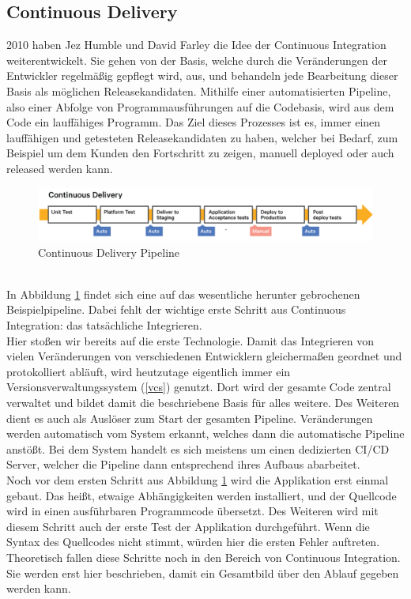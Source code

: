 \subsection{Continuous Delivery}
2010 haben Jez Humble und David Farley\autocite{Farley.2010} die Idee der Continuous Integration weiterentwickelt. Sie gehen von der Basis, welche durch die Veränderungen der Entwickler regelmäßig gepflegt wird, aus, und behandeln jede Bearbeitung dieser Basis als möglichen Releasekandidaten.\autocite[Vgl.][S.5]{Stahl.2018} Mithilfe einer automatisierten Pipeline, also einer Abfolge von Programmausführungen auf die Codebasis, wird aus dem Code ein lauffähiges Programm. Das Ziel dieses Prozesses ist es, immer einen lauffähigen und getesteten Releasekandidaten zu haben, welcher bei Bedarf, zum Beispiel um dem Kunden den Fortschritt zu zeigen, manuell deployed oder auch released werden kann.\autocite[Vgl.][S.16]{Stahl.2018}
\begin{figure}[h!]
	\centering
	\includegraphics[scale = 0.3]{img/CDE.png}
	\caption{Continuous Delivery Pipeline}
	\label{img:cde}
\end{figure}\\
In Abbildung \ref{img:cde} findet sich eine auf das wesentliche herunter gebrochenen Beispielpipeline. Dabei fehlt der wichtige erste Schritt aus Continuous Integration: das tatsächliche Integrieren.\\ Hier stoßen wir bereits auf die erste Technologie. Damit das Integrieren von vielen Veränderungen von verschiedenen Entwicklern gleichermaßen geordnet und protokolliert abläuft, wird heutzutage eigentlich immer ein Versionsverwaltungssystem (\ref{vcs}) genutzt.\autocite[Vgl.][S.2]{Arachchi.2018} Dort wird der gesamte Code zentral verwaltet und bildet damit die beschriebene Basis für alles weitere. Des Weiteren dient es auch als Auslöser zum Start der gesamten Pipeline. Veränderungen werden automatisch vom System erkannt, welches dann die automatische Pipeline anstößt. Bei dem System handelt es sich meistens um einen dedizierten CI/CD Server, welcher die Pipeline dann entsprechend ihres Aufbaus abarbeitet.\autocite[Vgl.][S.2]{Meyer.2014}\\ Noch vor dem ersten Schritt aus Abbildung \ref{img:cde} wird die Applikation erst einmal gebaut. Das heißt, etwaige Abhängigkeiten werden installiert, und der Quellcode wird in einen ausführbaren Programmcode übersetzt.\autocite[Vgl.][S.36]{Farley.2010} Des Weiteren wird mit diesem Schritt auch der erste Test der Applikation durchgeführt. Wenn die Syntax des Quellcodes nicht stimmt, würden hier die ersten Fehler auftreten.\autocite[Vgl.][S.37]{Farley.2010}\\ Theoretisch fallen diese Schritte noch in den Bereich von Continuous Integration. Sie werden erst hier beschrieben, damit ein Gesamtbild über den Ablauf gegeben werden kann.\\
